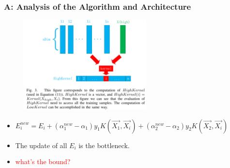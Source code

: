 \documentclass{beamer}
\begin{document}
\begin{frame}
	\frametitle{A: Analysis of the Algorithm and Architecture}

	\begin{figure}
		\includegraphics[width=0.6\textwidth]{fig/Fig3_CalcF.png}
	\end{figure} 
	\begin{itemize}
		\item $E_{i}^{new} = E_i + (\alpha_{1}^{new}-\alpha_1)y_1K(\vec{X_1},\vec{X_i}) + (\alpha_{2}^{new}-\alpha_2)y_2K(\vec{X_2},\vec{X_i})$
		\item The update of all $E_i$ is the bottleneck. 
		\item \textcolor{red}{what's the bound?}
	\end{itemize}	
\end{frame}
\end{document}

